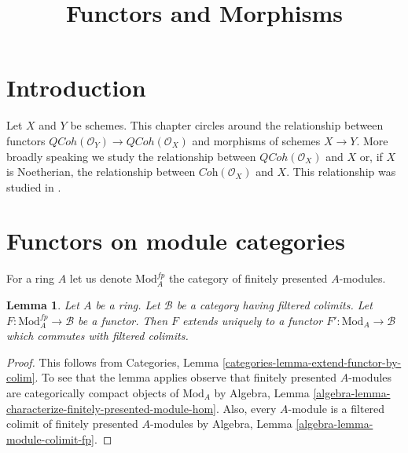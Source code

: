 \documentclass{stacks-project}
\theoremstyle{plain}
\newtheorem{lemma}[subsection]{Lemma}
\theoremstyle{definition}
\theoremstyle{remark}
\numberwithin{equation}{subsection}
\def\QCoh{\mathit{QCoh}}
\begin{document}
\title{Functors and Morphisms}


\maketitle

\label{section-phantom}

\tableofcontents

\section{Introduction}
\label{section-introduction}

\noindent
Let $X$ and $Y$ be schemes. This chapter circles around the relationship
between functors $\QCoh(\mathcal{O}_Y) \to \QCoh(\mathcal{O}_X)$ and
morphisms of schemes $X \to Y$. More broadly speaking we study the
relationship between $\QCoh(\mathcal{O}_X)$ and $X$ or, if $X$ is Noetherian,
the relationship between $\textit{Coh}(\mathcal{O}_X)$ and $X$.
This relationship was studied in \cite{Gabriel}.






\section{Functors on module categories}
\label{section-preliminary}

\noindent
For a ring $A$ let us denote $\text{Mod}^{fp}_A$ the category of
finitely presented $A$-modules.

\begin{lemma}
\label{lemma-functor-on-fp-modules}
Let $A$ be a ring. Let $\mathcal{B}$ be a category having filtered
colimits. Let $F : \text{Mod}^{fp}_A \to \mathcal{B}$ be a functor. Then $F$
extends uniquely to a functor $F' : \text{Mod}_A \to \mathcal{B}$
which commutes with filtered colimits.
\end{lemma}

\begin{proof}
This follows from
Categories, Lemma \ref{categories-lemma-extend-functor-by-colim}.
To see that the lemma applies observe that
finitely presented $A$-modules are
categorically compact objects of $\text{Mod}_A$ by
Algebra, Lemma \ref{algebra-lemma-characterize-finitely-presented-module-hom}.
Also, every $A$-module is a filtered colimit
of finitely presented $A$-modules by
Algebra, Lemma \ref{algebra-lemma-module-colimit-fp}.
\end{proof}
\end{document}

